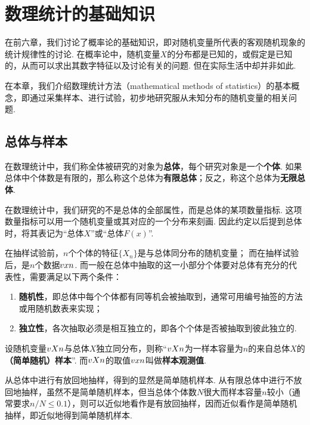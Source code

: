 \chapter{数理统计的基础知识}
在前六章，我们讨论了概率论的基础知识，即对随机变量所代表的客观随机现象的统计规律性的讨论.
在概率论中，随机变量\(X\)的分布都是已知的，或假定是已知的，从而可以求出其数字特征以及讨论有关的问题.
但在实际生活中却并非如此.

在本章，我们介绍数理统计方法（mathematical methods of statistics）的基本概念，即通过采集样本、进行试验，初步地研究服从未知分布的随机变量的相关问题.

\section{总体与样本}
\begin{definition}
在数理统计中，我们称全体被研究的对象为\textbf{总体}，每个研究对象是一个\textbf{个体}.
如果总体中个体数是有限的，那么称这个总体为\textbf{有限总体}；反之，称这个总体为\textbf{无限总体}.
\end{definition}

在数理统计中，我们研究的不是总体的全部属性，而是总体的某项数量指标.
这项数量指标可以用一个随机变量或其对应的一个分布来刻画.
因此约定以后提到总体时，将其表记为“总体\(X\)”或“总体\(F(x)\)”.

在抽样试验前，\(n\)个个体的特征\(\{X_n\}\)是与总体同分布的随机变量；
而在抽样试验后，是\(n\)个数据\(v{x}{n}\).
而一般在总体中抽取的这一小部分个体要对总体有充分的代表性，需要满足以下两个条件：
\begin{enumerate}
\item \textbf{随机性}，即总体中每个个体都有同等机会被抽取到，通常可用编号抽签的方法或用随机数表来实现；
\item \textbf{独立性}，各次抽取必须是相互独立的，即各个个体是否被抽取到彼此独立的.
\end{enumerate}

\begin{definition}
设随机变量\(v{X}{n}\)与总体\(X\)独立同分布，则称“\(v{X}{n}\)为一样本容量为\(n\)的来自总体\(X\)的\textbf{（简单随机）样本}”.
而\(v{X}{n}\)的取值\(v{x}{n}\)叫做\textbf{样本观测值}.
\end{definition}

从总体中进行有放回地抽样，得到的显然是简单随机样本.
从有限总体中进行不放回地抽样，虽然不是简单随机样本，但当总体个体数\(N\)很大而样本容量\(n\)较小（通常要求\(n/N \leqslant 0.1\)），则可以近似地看作是有放回抽样，因而近似看作是简单随机抽样，即近似地得到简单随机样本.

